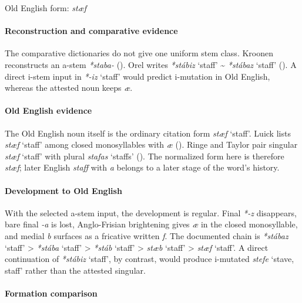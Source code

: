 \documentclass[
  british,
  a4paper,
]{article}
\providecommand{\Recon}[1]{\emph{*#1}}
\begin{document}
Old English form: \emph{stæf}

\paragraph{Reconstruction and comparative
evidence}\label{reconstruction-and-comparative-evidence-105}

The comparative dictionaries do not give one uniform stem class. Kroonen
reconstructs an a-stem \emph{*staba-}
(). Orel writes
\Recon{stábiz} `staff' \textasciitilde{} \Recon{stábaz} `staff'
(). A direct i-stem input in
\Recon{-iz} `staff' would predict i-mutation in Old English, whereas the
attested noun keeps \emph{æ}.

\paragraph{Old English evidence}\label{old-english-evidence-105}

The Old English noun itself is the ordinary citation form {\emph{stæf}}
`staff'. Luick lists {\emph{stæf}} `staff' among closed monosyllables
with \emph{æ} (). Ringe
and Taylor pair singular {\emph{stæf}} `staff' with plural
{\emph{stafas}} `staffs' (). The normalized form here is therefore \emph{stæf};
later English \emph{staff} with \emph{a} belongs to a later stage of the
word's history.

\paragraph{Development to Old
English}\label{development-to-old-english-105}

With the selected a-stem input, the development is regular. Final
\emph{*-z} disappears, bare final \emph{-a} is lost, Anglo-Frisian
brightening gives \emph{æ} in the closed monosyllable, and medial
\emph{b} surfaces as a fricative written \emph{f}. The documented chain
is \Recon{stábaz} `staff' \textgreater{} \Recon{stába} `staff'
\textgreater{} \Recon{stáb} `staff' \textgreater{} \emph{stæb} `staff'
\textgreater{} \emph{stæf} `staff'. A direct continuation of
\Recon{stábiz} `staff', by contrast, would produce i-mutated
{\emph{stefe}} `stave, staff' rather than the attested singular.

\paragraph{Formation comparison}\label{formation-comparison-5}
\end{document}
